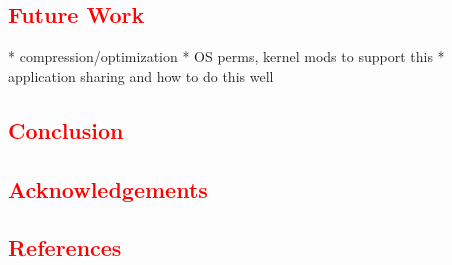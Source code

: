 \documentclass[12pt]{article}
\newcommand\TODO[1]{\textcolor{red}{#1}}
\begin{document}
\TODO{\section{Future Work}}
* compression/optimization
* OS perms, kernel mods to support this
* application sharing and how to do this well

\TODO{\section{Conclusion}}

\TODO{\section{Acknowledgements}}

\TODO{\section{References}}



\end{document}
